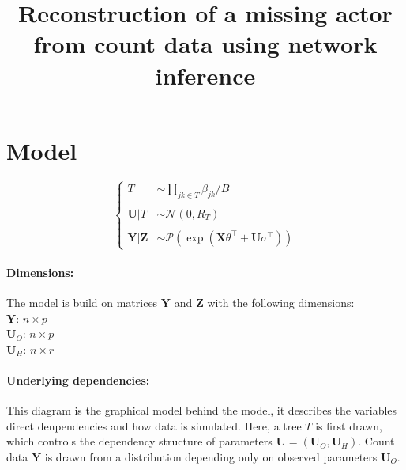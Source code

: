 \documentclass[11pt,a4paper]{article}
\title{Reconstruction of a missing actor from count data using network inference}
\newcommand{\Xbf}{\boldsymbol{X}}
\newcommand{\Ybf}{\boldsymbol{Y}}
\newcommand{\Zbf}{\boldsymbol{Z}}
\newcommand{\Ubf}{\boldsymbol{U}}
\newcommand{\edgeunit}{1.5}
\begin{document}
\maketitle
\vspace{3cm}


\section{Model}

$$\left\{\begin{array}{rl}
T & \sim\prod_{jk \in T} \beta_{jk}/B \\\\
\Ubf |T& \sim\mathcal{N}(0,R_T)\\\\
\Ybf|\Zbf&\sim\mathcal{P}( \exp( \Xbf\theta^\intercal + \Ubf\sigma^\intercal) )
\end{array} \right.$$

\paragraph{Dimensions:}
The model is build on matrices $\Ybf$ and $\Zbf$ with the following dimensions:\\
$\Ybf$: $n\times p$\\
$\Ubf_O$: $n\times p$\\
$\Ubf_H$: $n\times r$


\paragraph{Underlying dependencies:} This diagram is the graphical model behind the model, it describes the variables direct denpendencies and how data is simulated. Here, a tree $T$ is first drawn, which controls the dependency structure of parameters $\Ubf = (\Ubf_O,\Ubf_H)$. Count data $\Ybf$ is drawn from a distribution depending only on observed parameters $\Ubf_O$.
\begin{center}
\end{center}
\end{document}
